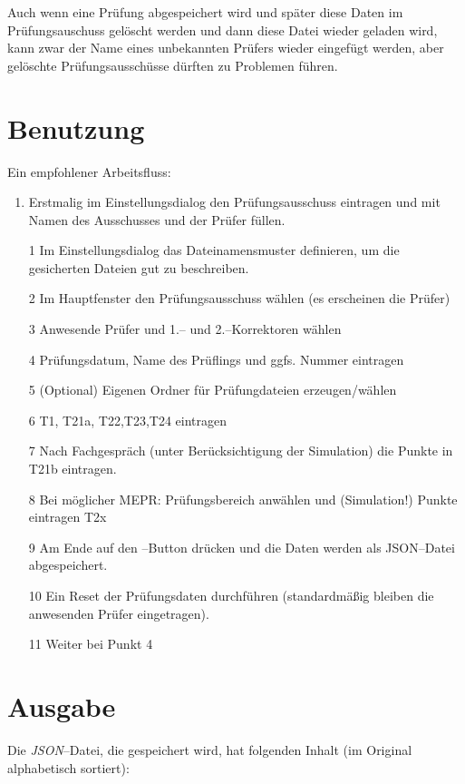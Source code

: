\documentclass[a4paper,notitlepage,parskip=half]{scrartcl}
\begin{document}
Auch wenn eine Prüfung abgespeichert wird und später diese Daten im Prüfungsauschuss gelöscht werden und dann diese Datei wieder geladen wird, kann zwar der Name eines unbekannten Prüfers wieder eingefügt werden, aber gelöschte Prüfungsausschüsse dürften zu Problemen führen.

\section{Benutzung}

Ein empfohlener Arbeitsfluss:

\begin{enumerate}
\item Erstmalig im Einstellungsdialog den Prüfungsausschuss eintragen und mit Namen des Ausschusses und der Prüfer füllen.
\item[1] Im Einstellungsdialog das Dateinamensmuster definieren, um die gesicherten Dateien gut zu beschreiben.
\item[2] Im Hauptfenster den Prüfungsausschuss wählen (es erscheinen die Prüfer)
\item[3] Anwesende Prüfer und 1.-- und 2.--Korrektoren wählen
\item[4] Prüfungsdatum, Name des Prüflings und ggfs. Nummer eintragen
\item[5] (Optional) Eigenen Ordner für Prüfungdateien erzeugen/wählen
\item[6] T1, T21a, T22,T23,T24 eintragen
\item[7] Nach Fachgespräch (unter Berücksichtigung der Simulation) die Punkte in T21b eintragen.
\item[8] Bei möglicher MEPR: Prüfungsbereich anwählen und (Simulation!) Punkte eintragen T2x
\item[9] Am Ende auf den --Button drücken und die Daten werden als JSON--Datei abgespeichert.
\item[10] Ein Reset der Prüfungsdaten durchführen (standardmäßig bleiben die anwesenden Prüfer eingetragen).
\item[11] Weiter bei Punkt 4
\end{enumerate}

\section{Ausgabe}
Die \emph{JSON}--Datei, die gespeichert wird, hat folgenden Inhalt (im Original alphabetisch sortiert):
\nopagebreak[4]
\end{document}
